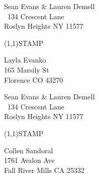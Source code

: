 \documentclass[12pt]{article}
\begin{document}
\clearpage

\begin{minipage}{.5\linewidth} \noindent
Sean Evans \& Lauren Demell\\\ 
134 Crescent Lane\\ 
Roslyn Heights NY 11577
\end{minipage}
\begin{minipage}{.5\linewidth \hspace{-.2in} \vspace{-.3in}}
\begin{flushright}
\framebox(1,1){STAMP}
\end{flushright}
\end{minipage}

\begin{center} \begin{Huge} \vspace*{\fill}
Layla Evanko\\
165 Marsily St\\
Florence CO 43270\\
\vspace{\fill} \end{Huge} \end{center}

\clearpage

\begin{minipage}{.5\linewidth} \noindent
Sean Evans \& Lauren Demell\\\ 
134 Crescent Lane\\ 
Roslyn Heights NY 11577
\end{minipage}
\begin{minipage}{.5\linewidth \hspace{-.2in} \vspace{-.3in}}
\begin{flushright}
\framebox(1,1){STAMP}
\end{flushright}
\end{minipage}

\begin{center} \begin{Huge} \vspace*{\fill}
Collen Sandoral\\
1761 Avalon Ave\\
Fall River Mills CA 25332\\
\vspace{\fill} \end{Huge} \end{center}
\end{document}
